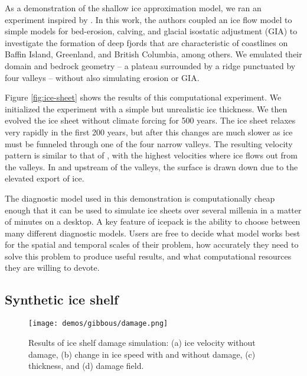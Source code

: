 \documentclass[journal abbreviation, manuscript]{copernicus}
\begin{document}
As a demonstration of the shallow ice approximation model, we ran an experiment inspired by \cite{kessler2008fjord}.
In this work, the authors coupled an ice flow model to simple models for bed-erosion, calving, and glacial isostatic adjustment (GIA) to investigate the formation of deep fjords that are characteristic of coastlines on Baffin Island, Greenland, and British Columbia, among others.
We emulated their domain and bedrock geometry -- a plateau surrounded by a ridge punctuated by four valleys -- without also simulating erosion or GIA.

Figure \ref{fig:ice-sheet} shows the results of this computational experiment.
We initialized the experiment with a simple but unrealistic ice thickness.
We then evolved the ice sheet without climate forcing for 500 years.
The ice sheet relaxes very rapidly in the first 200 years, but after this changes are much slower as ice must be funneled through one of the four narrow valleys.
The resulting velocity pattern is similar to that of \citet{kessler2008fjord}, with the highest velocities where ice flows out from the valleys.
In and upstream of the valleys, the surface is drawn down due to the elevated export of ice.

The diagnostic model used in this demonstration is computationally cheap enough that it can be used to simulate ice sheets over several millenia in a matter of minutes on a desktop.
A key feature of icepack is the ability to choose between many different diagnostic models.
Users are free to decide what model works best for the spatial and temporal scales of their problem, how accurately they need to solve this problem to produce useful results, and what computational resources they are willing to devote.


\subsection{Synthetic ice shelf}

\begin{figure}[h]
    \texttt{[image: demos/gibbous/damage.png]}
    \caption{Results of ice shelf damage simulation: (a) ice velocity without damage, (b) change in ice speed with and without damage, (c) thickness, and (d) damage field.}
    \label{fig:damage}
\end{figure}
\end{document}
